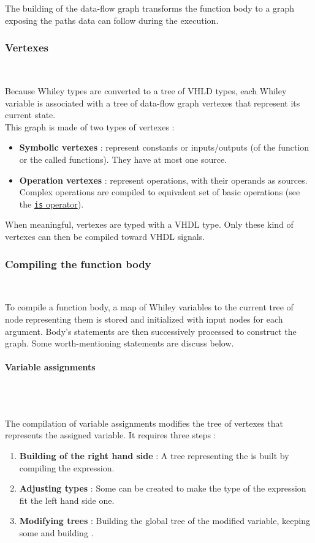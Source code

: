 \documentclass[10pt,a4paper]{article}
\newcommand{\code}{\texttt}
\renewcommand{\indent}{~\\\vspace{-.8cm}}
\newcommand{\pindent}{~\\\indent}
\begin{document}
The building of the data-flow graph transforms the function body to a graph exposing the paths data can follow during the execution. 


\subsubsection{Vertexes}
\indent

Because Whiley types are converted to a tree of VHLD types, each Whiley variable is associated with a tree of data-flow graph vertexes that represent its current state. \\

This graph is made of two types of vertexes : 
\begin{itemize}
	\item \textbf{Symbolic vertexes} : represent constants or inputs/outputs (of the function or the called functions). They have at most one source.
	\item \textbf{Operation vertexes} : represent operations, with their operands as sources. Complex operations are compiled to equivalent set of basic operations (see the \hyperref[FlowT]{\code {is} operator}).
\end{itemize}



When meaningful, vertexes are typed with a VHDL type. Only these kind of vertexes can then be compiled toward VHDL signals.



\subsubsection{Compiling the function body} \indent

To compile a function body, a map of Whiley variables to the current tree of node representing them is stored and initialized with input nodes for each argument. Body's statements are then successively processed to construct the graph. Some worth-mentioning statements are discuss below.

\paragraph{Variable assignments}\pindent


The compilation of variable assignments modifies the tree of vertexes that represents the assigned variable. It requires three steps :

\begin{enumerate}
	\item \textbf{Building of the right hand side} : A tree representing the  is built by compiling the expression.
	\item \textbf{Adjusting types} : Some  can be created to make the type of the expression fit the left hand side one.
	\item \textbf{Modifying trees} : Building the global tree of the modified variable, keeping some  and building .
\end{enumerate}
\end{document}

